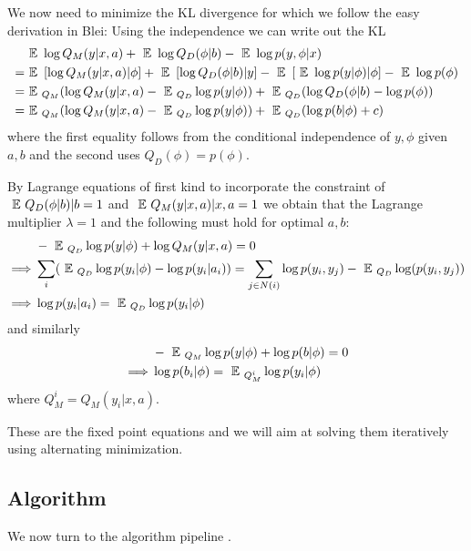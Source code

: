 \documentclass{article} %
\begin{document}
We now need to minimize the KL divergence for which we follow the easy derivation in Blei:
Using the independence we can write out the KL 
\begin{align*}
&\mbox{ }\mathbb{E}\mbox{ } \log Q_M(y|x,a) + \mbox{ }\mathbb{E}\mbox{ } \log Q_D(\phi|b) - \mbox{ }\mathbb{E}\mbox{ } \log p(y,\phi|x)\\
 = &\mbox{ }\mathbb{E}\mbox{ } \left[\log Q_M(y|x,a)|\phi \right] + \mbox{ }\mathbb{E}\mbox{ } \left[ \log Q_D(\phi|b) |y\right] - \mbox{ }\mathbb{E}\mbox{ } \left[\mbox{ }\mathbb{E}\mbox{ } \log p(y|\phi) |\phi \right]- \mbox{ }\mathbb{E}\mbox{ } \log p(\phi)\\
= &\mbox{ }\mathbb{E}\mbox{ }_{Q_M} (\log Q_M(y|x,a) - \mbox{ }\mathbb{E}\mbox{ }_{Q_D} \log p(y|\phi)) + \mbox{ }\mathbb{E}\mbox{ }_{Q_D} (\log Q_D(\phi|b) - \log p(\phi))\\
= &\mbox{ }\mathbb{E}\mbox{ }_{Q_M} (\log Q_M(y|x,a) - \mbox{ }\mathbb{E}\mbox{ }_{Q_D} \log p(y|\phi)) + \mbox{ }\mathbb{E}\mbox{ }_{Q_D} (\log p(b|\phi) + c)
\end{align*}
where the first equality follows from the conditional independence of $y,\phi$ given $a,b$ and the second uses $Q_D(\phi) = p(\phi)$.

By Lagrange equations of first kind to incorporate the constraint of $\mbox{ }\mathbb{E}\mbox{ } Q_D(\phi|b) |b = 1$ and $\mbox{ }\mathbb{E}\mbox{ } Q_M(y|x,a) |x,a = 1$  we obtain that the Lagrange multiplier $\lambda = 1$ and the following must hold for optimal $a,b$:
\begin{align*}
& -\mbox{ }\mathbb{E}\mbox{ }_{Q_D} \log p(y|\phi) + \log Q_M(y|x,a) = 0\\
\implies  &\sum_i (\mbox{ }\mathbb{E}\mbox{ }_{Q_D}\log p(y_i|\phi) - \log p(y_i|a_i)) = \sum_{j\in N(i)} \log p(y_i,y_j) - \mbox{ }\mathbb{E}\mbox{ }_{Q_D} \log(p(y_i,y_j)) \\
\implies &\log p(y_i|a_i) = \mbox{ }\mathbb{E}\mbox{ }_{Q_D} \log p(y_i|\phi) 
\end{align*}
and similarly
\begin{align*}
&- \mbox{ }\mathbb{E}\mbox{ }_{Q_M} \log p(y|\phi) + \log p(b|\phi) = 0\\
\implies &\log p(b_i|\phi) = \mbox{ }\mathbb{E}\mbox{ }_{Q^i_M} \log p(y_i|\phi)  
\end{align*}
where $Q_M^i = Q_M(y_i|x,a)$.

These are the fixed point equations and we will aim at solving them iteratively using alternating minimization. 

\subsection{Algorithm}

We now turn to the algorithm pipeline
. 
\end{document}
